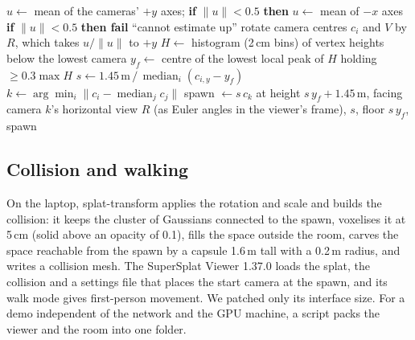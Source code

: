 \begin{algorithm}[!htb]
	\caption{Scene alignment (\texttt{scene.json})}
	\label{alg:scene}
	\begin{algorithmic}[1]
		\State $u \gets$ mean of the cameras' $+y$ axes; \textbf{if} $\lVert u\rVert < 0.5$ \textbf{then} $u \gets$ mean of $-x$ axes
		\State \textbf{if} $\lVert u\rVert < 0.5$ \textbf{then fail} ``cannot estimate up''
		\State rotate camera centres $c_i$ and $V$ by $R$, which takes $u/\lVert u\rVert$ to $+y$
		\State $H \gets$ histogram (2\,cm bins) of vertex heights below the lowest camera
		\State $y_f \gets$ centre of the lowest local peak of $H$ holding $\ge 0.3 \max H$ 
		\State $s \gets 1.45\,\mathrm{m} \,/\, \operatorname{median}_i (c_{i,y} - y_f)$ 
		\State $k \gets \arg\min_i \lVert c_i - \operatorname{median}_j c_j\rVert$ 
		\State spawn $\gets s\,c_k$ at height $s\,y_f + 1.45$\,m, facing camera $k$'s horizontal view
		\State \Return $R$ (as Euler angles in the viewer's frame), $s$, floor $s\,y_f$, spawn
		\EndProcedure
	\end{algorithmic}
\end{algorithm}

\subsection{Collision and walking}
On the laptop, splat-transform \cite{splattransform} applies the rotation and scale and builds the collision: it keeps the cluster of Gaussians connected to the spawn, voxelises it at 5\,cm (solid above an opacity of 0.1), fills the space outside the room, carves the space reachable from the spawn by a capsule 1.6\,m tall with a 0.2\,m radius, and writes a collision mesh. The SuperSplat Viewer \cite{supersplatviewer} 1.37.0 loads the splat, the collision and a settings file that places the start camera at the spawn, and its walk mode gives first-person movement. We patched only its interface size. For a demo independent of the network and the GPU machine, a script packs the viewer and the room into one folder.

